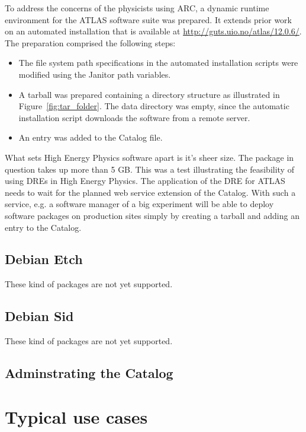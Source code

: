 To address the concerns of the physicists using ARC, a dynamic runtime environment for the
ATLAS software suite was prepared. It extends prior work on an automated installation that is available at
\href{http://guts.uio.no/atlas/12.0.6/}{http://guts.uio.no/atlas/12.0.6/}. The preparation comprised the following steps:
\begin{itemize}
    \item The file system path specifications in the automated installation scripts were modified using the Janitor
       path variables.
    \item A tarball was prepared containing a directory structure as illustrated in Figure~\ref{fig:tar_folder}. The data directory
       was empty, since the automatic installation script downloads the software from a remote server.
    \item An entry was added to the Catalog file.
\end{itemize}
What sets High Energy Physics software apart is it's sheer size. The package in question takes up more than
5 GB. This was a test illustrating the feasibility of using DREs in High Energy Physics. The application
of the DRE for ATLAS needs to wait for the planned web service extension of the Catalog. With such a
service, e.g. a software manager of a big experiment will be able to deploy software packages on production
sites simply by creating a tarball and adding an entry to the Catalog.


\subsection{Debian Etch}

These kind of packages are not yet supported.

\subsection{Debian Sid}

These kind of packages are not yet supported.

\subsection{Adminstrating the Catalog}

\section{Typical use cases}\label{sec:catalog}

